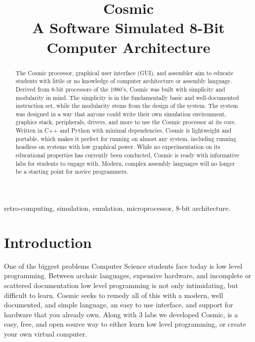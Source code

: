 \documentclass[conference]{IEEEtran}
\begin{document}
\title{Cosmic\\A Software Simulated 8-Bit Computer Architecture}
\author{
\and
{}
}
\maketitle


\begin{abstract}
The Cosmic processor, graphical user interface (GUI), and assembler aim to educate students with little or no knowledge of computer architecture or assembly language. Derived from 8-bit processors of the 1980’s, Cosmic was built with simplicity and modularity in mind. The simplicity is in the fundamentally basic and well-documented instruction set, while the modularity stems from the design of the system. The system was designed in a way that anyone could write their own simulation environment, graphics stack, peripherals, drivers, and more to use the Cosmic processor at its core. Written in C++ and Python with minimal dependencies, Cosmic is lightweight and portable, which makes it perfect for running on almost any system, including running headless on systems with low graphical power. While no experimentation on its educational properties has currently been conducted, Cosmic is ready with informative labs for students to engage with. Modern, complex assembly languages will no longer be a starting point for novice programmers.
\end{abstract}

\begin{IEEEkeywords}
retro-computing, simulation, emulation, microprocessor, 8-bit architecture.
\end{IEEEkeywords}


\section{Introduction}
One of the biggest problems Computer Science students face today is low level programming. Between archaic languages, expensive hardware, and incomplete or scattered documentation low level programming is not only intimidating, but difficult to learn. Cosmic seeks to remedy all of this with a modern, well documented, and simple language, an easy to use interface, and support for hardware that you already own. Along with 3 labs we developed Cosmic, is a easy, free, and open source way to either learn low level programming, or create your own virtual computer. 
\end{document}
